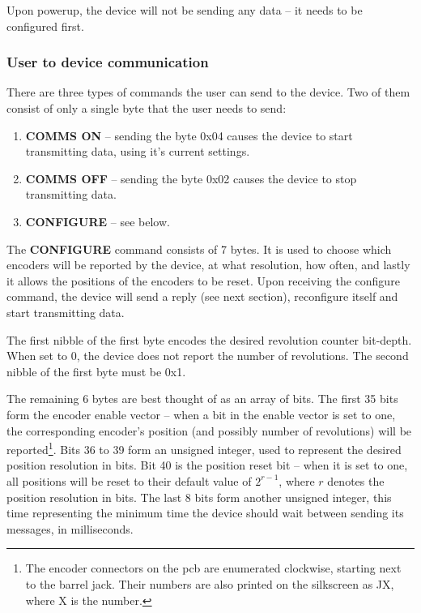 \documentclass[twoside]{article}
\begin{document}
Upon powerup, the device will not be sending any data -- it needs to be configured first.

\subsubsection{User to device communication}

There are three types of commands the user can send to the device. Two of them consist of only a single byte that the user needs to send:

\begin{enumerate}
\item \textbf{COMMS ON} -- sending the byte 0x04 causes the device to start transmitting data, using it's current settings.
\item \textbf{COMMS OFF} -- sending the byte 0x02 causes the device to stop transmitting data.
\item \textbf{CONFIGURE} -- see below.
\end{enumerate}

The \textbf{CONFIGURE} command consists of 7 bytes. It is used to choose which encoders will be reported by the device, at what resolution, how often, and lastly it allows the positions of the encoders to be reset. Upon receiving the configure command, the device will send a reply (see next section), reconfigure itself and start transmitting data.

The first nibble of the first byte encodes the desired revolution counter bit-depth. When set to 0, the device does not report the number of revolutions. The second nibble of the first byte must be 0x1. 

The remaining 6 bytes are best thought of as an array of bits. The first 35 bits form the encoder enable vector -- when a bit in the enable vector is set to one, the corresponding encoder's position (and possibly number of revolutions) will be reported\footnote{The encoder connectors on the pcb are enumerated clockwise, starting next to the barrel jack. Their numbers are also printed on the silkscreen as JX, where X is the number.}. Bits 36 to 39 form an unsigned integer, used to represent the desired position resolution in bits. Bit 40 is the position  reset bit -- when it is set to one, all positions will be reset to their default value of $2^{r-1}$, where $r$ denotes the position resolution in bits. The last 8 bits form another unsigned integer, this time representing the minimum time the device should wait between sending its messages, in milliseconds.
\end{document}
